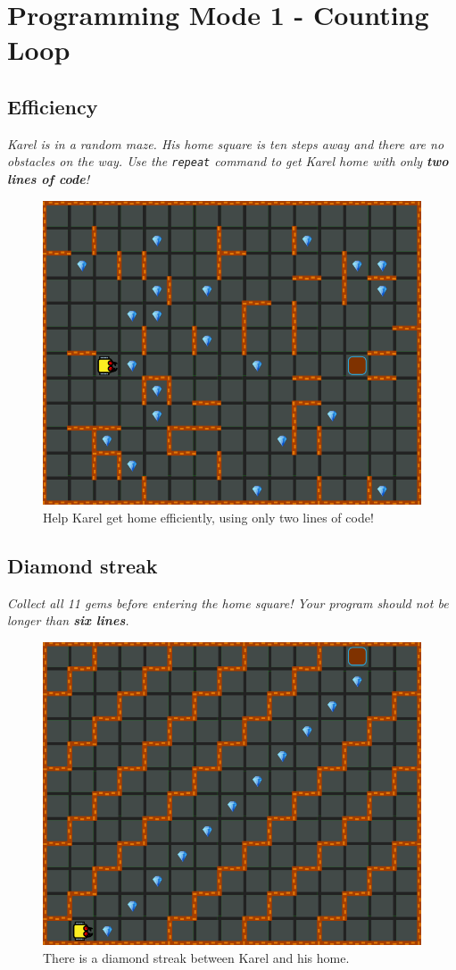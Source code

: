 \setcounter{section}{4}
\section{Programming Mode 1 - Counting Loop}

\subsection{Efficiency}

{\em Karel is in a random maze. His home square is ten steps away and there are no obstacles on the way. Use the {\tt repeat} command to get Karel home with only {\bf two lines of code}!}\\[-7mm]

\begin{figure}[!ht]
\begin{center}
\includegraphics[height=0.4\textwidth]{img/c01.png}
\end{center}
\vspace{-4mm}
\caption{Help Karel get home efficiently, using only two lines of code!}
\label{fig:c01}
\vspace{-1cm}
\end{figure}


\subsection{Diamond streak}

{\em Collect all 11 gems before entering the home square! Your program should not be longer than {\bf six lines}.}\\[-7mm]

\begin{figure}[!ht]
\begin{center}
\includegraphics[height=0.4\textwidth]{img/c02.png}
\end{center}
\vspace{-4mm}
\caption{There is a diamond streak between Karel and his home.}
\label{fig:c02}
\vspace{-10mm}
\end{figure}
\noindent

